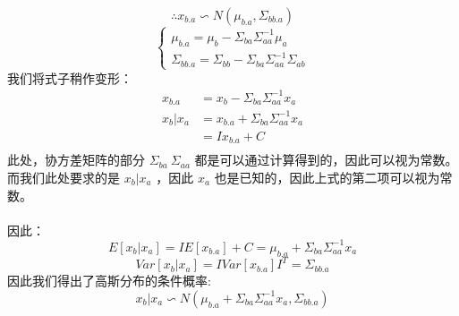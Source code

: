 \documentclass{report}
\begin{document}
$$
\therefore x_{b.a} \backsim N(\mu_{b.a}, \Sigma_{bb.a})
$$
$$
\begin{cases}
\mu_{b.a} = \mu_b - \Sigma_{ba} \Sigma_{aa}^{-1} \mu_a \\
\Sigma_{bb.a}=\Sigma_{bb} - \Sigma_{ba} \Sigma_{aa}^{-1} \Sigma_{ab}
\end{cases}
$$
我们将式子稍作变形：
$$
\begin{aligned}
x_{b.a}
&=x_b - \Sigma_{ba} \Sigma_{aa}^{-1} x_a\\
x_b | x_a&=x_{b.a} + \Sigma_{ba} \Sigma_{aa}^{-1} x_a\\
&=I x_{b.a} + C\\
\end{aligned}
$$
此处，协方差矩阵的部分 $\Sigma_{ba} \ \Sigma_{aa}$ 都是可以通过计算得到的，因此可以视为常数。\\
而我们此处要求的是 $x_b | x_a$ ，因此 $x_a$ 也是已知的，因此上式的第二项可以视为常数。\\\\
因此：
$$
E[x_b|x_a]=I E[x_{b.a}] + C = \mu_{b.a} + \Sigma_{ba} \Sigma_{aa}^{-1} x_a
$$
$$
Var[x_b|x_a]=IVar[x_{b.a}]I^T=\Sigma_{bb.a}
$$
因此我们得出了高斯分布的条件概率:
$$
x_b|x_a \backsim N(\mu_{b.a} + \Sigma_{ba} \Sigma_{aa}^{-1} x_a, \Sigma_{bb.a})
$$
\end{document}
